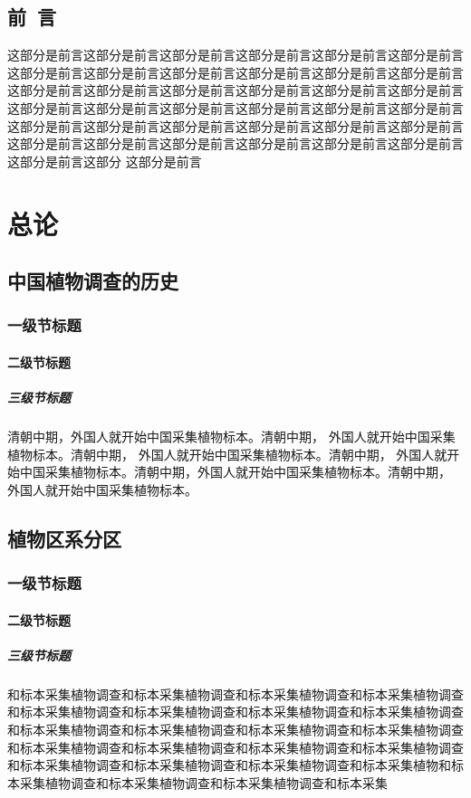 \chapter{前~言}
这部分是前言这部分是前言这部分是前言这部分是前言这部分是前言这部分是前言这部分是前言这部分是前言这部分是前言这部分是前言这部分是前言这部分是前言这部分是前言这部分是前言这部分是前言这部分是前言这部分是前言这部分是前言这部分是前言这部分是前言这部分是前言这部分是前言这部分是前言这部分是前言这部分是前言这部分是前言这部分是前言这部分是前言这部分是前言这部分是前言这部分是前言这部分是前言这部分是前言这部分是前言这部分是前言这部分是前言这部分是前言这部分
这部分是前言
\renewcommand\contentsname{目~录}
\tableofcontents
\mainmatter
\part{总论}
\chapter{中国植物调查的历史}
\section{一级节标题}
\subsection{二级节标题}
\subsubsection{三级节标题}
\begin{multicols}{2}
清朝中期，外国人就开始中国采集植物标本。清朝中期， 外国人就开始中国采集植物标本。清朝中期， 外国人就开始中国采集植物标本。清朝中期， 外国人就开始中国采集植物标本。清朝中期，外国人就开始中国采集植物标本。清朝中期， 外国人就开始中国采集植物标本。
\end{multicols}
\chapter{植物区系分区}
\section{一级节标题}
\subsection{二级节标题}
\subsubsection{三级节标题}
\begin{multicols}{2}
和标本采集植物调查和标本采集植物调查和标本采集植物调查和标本采集植物调查和标本采集植物调查和标本采集植物调查和标本采集植物调查和标本采集植物调查和标本采集植物调查和标本采集植物调查和标本采集植物调查和标本采集植物调查和标本采集植物调查和标本采集植物调查和标本采集植物调查和标本采集植物调查和标本采集植物调查和标本采集植物调查和标本采集植物调查和标本采集植物和标本采集植物调查和标本采集植物调查和标本采集植物调查和标本采集
\end{multicols}
